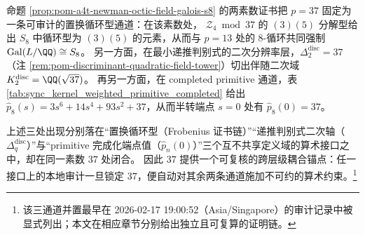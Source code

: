 \begin{remark}\label{rem:pom-a4t-prime37-three-channel-anchor}
命题 \ref{prop:pom-a4t-newman-octic-field-galois-s8} 的两素数证书把 \(p=37\) 固定为一条可审计的置换循环型通道：在该素数处，
\(\mathcal Z_4\bmod 37\) 的 \((3)(5)\) 分解型给出 \(S_8\) 中循环型为 \((3)(5)\) 的元素，从而与 \(p=13\) 处的 \(8\)-循环共同强制 \(\mathrm{Gal}(L/\QQ)\cong S_8\)。
另一方面，在最小递推判别式的二次分辨率层，\(\Delta_2^{\mathrm{disc}}=37\)（注 \ref{rem:pom-discriminant-quadratic-field-tower}）切出伴随二次域 \(K_2^{\mathrm{disc}}=\QQ(\sqrt{37})\)。
再另一方面，在 completed primitive 通道，表 \ref{tab:sync_kernel_weighted_primitive_completed} 给出
\(\widehat p_8(s)=3s^6+14s^4+93s^2+37\)，从而半转端点 \(s=0\) 处有 \(\widehat p_8(0)=37\)。
\par
上述三处出现分别落在“置换循环型（Frobenius 证书链）”“递推判别式二次轴（\(\Delta_q^{\mathrm{disc}}\)）”与“primitive 完成化端点值（\(\widehat p_n(0)\)）”三个互不共享定义域的算术接口之中，却在同一素数 \(37\) 处闭合。
因此 \(37\) 提供一个可复核的跨层级耦合锚点：任一接口上的本地审计一旦锁定 \(37\)，便自动对其余两条通道施加不可约的算术约束。\footnote{该三通道并置最早在 2026-02-17 19:00:52（Asia/Singapore）的审计记录中被显式列出；本文在相应章节分别给出独立且可复算的证明链。}
\end{remark}

